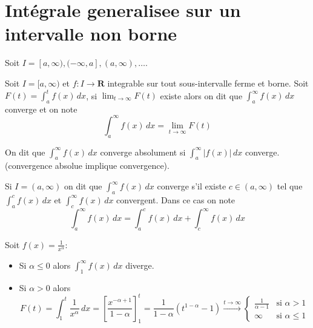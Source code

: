 \section{Intégrale generalisee sur un intervalle non borne}

Soit  $I=[a,\infty),(-\infty,a],(a,\infty),\dots$. 
\begin{definition}
Soit $I=[a,\infty)$ et $f:I\to \mathbf{R}$ integrable sur tout sous-intervalle ferme et borne. Soit $F(t)=\int_{a}^{t} f(x) \, dx$, si $\lim_{ t \to \infty }F(t)$ existe alors on dit que $\int_{a}^{\infty} f(x) \, dx$ converge et on note
$$
\int_{a}^{\infty} f(x) \, dx =\lim_{ t \to \infty } F(t)
$$
\end{definition}
\begin{remark}
On dit que $\int_{a}^{\infty}f(x)  \, dx$ converge absolument si $\int_{a}^{\infty} |f(x)| \, dx$ converge. (convergence absolue implique convergence).
\end{remark}
\begin{definition}
Si $I=(a,\infty)$ on dit que $\int_{a}^{\infty} f(x) \, dx$ converge s'il existe $c\in(a,\infty)$ tel que $\int_{a}^{c} f(x) \, dx$ et $\int_{c}^{\infty} f(x) \, dx$ convergent. Dans ce cas on note
$$
\int_{a}^{\infty} f(x) \, dx =\int_{a}^{c} f(x) \, dx +\int_{c}^{\infty} f(x) \, dx
$$
\end{definition}
\begin{example}[Important!]
Soit $f(x)=\frac{1}{x^{\alpha}}$:
\begin{itemize}
\item Si $\alpha\leq 0$ alors $\int_{1}^{\infty} f(x) \, dx$ diverge.
\item Si $\alpha>0$ alors $$F(t)=\int_{1}^{t} \frac{1}{x^{\alpha}} \, dx=\left[ \frac{x^{-\alpha+1}}{1-\alpha} \right]^{t}_{1}=\frac{1}{1-\alpha}(t^{1-\alpha}-1)\overset{t\to \infty }\to \begin{cases}
\frac{1}{\alpha-1} & \text{si }\alpha>1 \\
\infty & \text{si }\alpha \leq 1
\end{cases}$$
\end{itemize}
\end{example}

